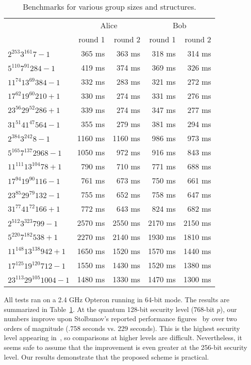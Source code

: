 \documentclass[envcountsect,envcountsame,runningheads]{llncs}   %
\begin{document}
\begin{table}[t]
  \centering
  \begin{tabular}{l | r | r | r | r}
    & \multicolumn{2}{c|}{Alice} & \multicolumn{2}{|c}{Bob}\\
    & round 1 & round 2 & round 1 & round 2\\
    \hline
    $2^{253}3^{161}7-1$ &  365 ms &  363 ms &  318 ms &  314 ms \\
    $5^{110} 7^{91} 284 - 1$ & 419 ms & 374 ms & 369 ms & 326 ms \\
    $11^{74}13^{69}384-1$ & 332 ms & 283 ms & 321 ms & 272 ms \\
    $17^{62}19^{60}210+1$ & 330 ms & 274 ms & 331 ms & 276 ms\\
    $23^{56}29^{52}286+1$ & 339 ms & 274 ms & 347 ms & 277 ms \\
    $31^{51}41^{47}564-1$ & 355 ms & 279 ms & 381 ms & 294 ms \\
    \hline
    $2^{384}3^{242}8-1$ & 1160 ms & 1160 ms &  986 ms &  973 ms \\
    $5^{165}7^{137}2968-1$ & 1050 ms & 972 ms & 916 ms & 843 ms\\
    $11^{111}13^{104} 78 + 1$ & 790 ms & 710 ms & 771 ms & 688 ms\\
    $17^{94}19^{90}116 - 1$ & 761 ms & 673 ms & 750 ms & 661 ms\\
    $23^{85}29^{79}132 - 1$ & 755 ms & 652 ms & 758 ms & 647 ms\\
    $31^{77}41^{72}166 + 1$ & 772 ms & 643 ms & 824 ms & 682 ms\\
    \hline
    $2^{512}3^{323}799-1$ & 2570 ms & 2550 ms & 2170 ms & 2150 ms\\
    $5^{220}7^{182}538 + 1$ & 2270 ms & 2140 ms & 1930 ms & 1810 ms \\
    $11^{148}13^{138}942 + 1$ & 1650 ms & 1520 ms & 1570 ms & 1440 ms\\
    $17^{125}19^{120}712 - 1$ & 1550 ms & 1430 ms & 1520 ms & 1380 ms\\
    $23^{113}29^{105}1004-1$ & 1480 ms & 1330 ms & 1470 ms & 1300 ms
  \end{tabular} 

\vspace{1em}

  \caption{Benchmarks for various group sizes and structures.}
  \label{tab:benchs}
\end{table}

All tests ran on a 2.4 GHz Opteron running in 64-bit mode. The results are
summarized in Table~\ref{tab:benchs}. At the quantum 128-bit security level
(768-bit $p$), our numbers improve upon Stolbunov's
reported performance
figures~\cite[Table 1]{Stol} by over two orders of magnitude (.758
seconds vs. 229 seconds).
This is the highest security level appearing in~\cite[Table 1]{Stol}, so
comparisons at higher levels are difficult. Nevertheless, it
seems safe to assume that the improvement is even greater at the
256-bit security level. Our results demonstrate that the proposed
scheme is practical.
\end{document}
